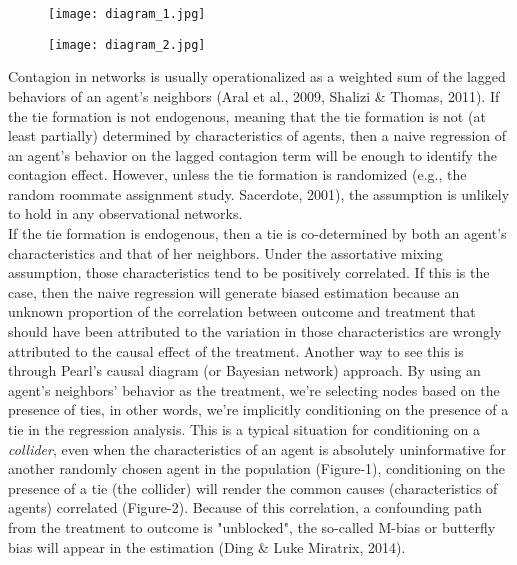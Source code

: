 \documentclass[11pt]{article}
\begin{document}
\begin{figure}
\centering
\begin{minipage}{.5\textwidth}
 \centering
 \hspace*{-1.2in} %
  \texttt{[image: diagram\_1.jpg]}
  \label{fig:diagram1}
\end{minipage}%
\begin{minipage}{.5\textwidth}
\centering
\hspace*{-0.2in} %
  \texttt{[image: diagram\_2.jpg]}
  \label{fig:diagram2}
\end{minipage}
\end{figure}

Contagion in networks is usually operationalized as a weighted sum of the lagged behaviors of an agent's neighbors (Aral et al., 2009, Shalizi \& Thomas, 2011). If the tie formation is not endogenous, meaning that the tie formation is not (at least partially) determined by characteristics of agents, then a naive regression of an agent's behavior on the lagged contagion term will be enough to identify the contagion effect. However, unless the tie formation is randomized (e.g., the random roommate assignment study. Sacerdote, 2001), the assumption is unlikely to hold in any observational networks.\\

If the tie formation is endogenous, then a tie is co-determined by 
both an agent's characteristics and that of her neighbors. Under the assortative mixing assumption, those characteristics tend to be positively correlated. If this is the case, then the naive regression will generate biased estimation because an unknown proportion of the correlation between outcome and treatment that should have been attributed to the variation in those characteristics are wrongly attributed to the causal effect of the treatment. Another way to see this is through Pearl's causal diagram (or Bayesian network) approach. By using an agent's neighbors' behavior as the treatment, we're selecting nodes based on the presence of ties, in other words, we're implicitly conditioning on the presence of a tie in the regression analysis. This is a typical situation for conditioning on a \emph{collider}, even when the characteristics of an agent is absolutely uninformative for another randomly chosen agent in the population (Figure-1), conditioning on the presence of a tie (the collider) will render the common causes (characteristics of agents) correlated (Figure-2). Because of this correlation, a confounding path from the treatment to outcome is "unblocked", the so-called M-bias or butterfly bias will appear in the estimation (Ding \& Luke Miratrix, 2014).\\
\end{document}
